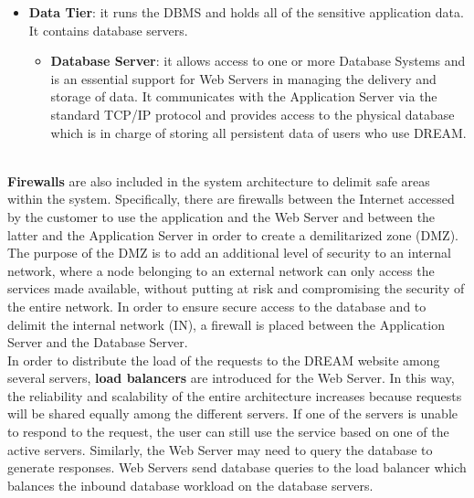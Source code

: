 \begin{itemize}
\begin{itemize}
    \end{itemize}
    \item \textbf{Data Tier}: it runs the DBMS and holds all of the sensitive application data. It contains database servers.
    \begin{itemize}
        \item \textbf{Database Server}: it allows access to one or more Database Systems and is an essential support for Web Servers in managing the delivery and storage of data. It communicates with the Application Server via the standard TCP/IP protocol and provides access to the physical database which is in charge of storing all persistent data of users who use DREAM.
    \end{itemize}
\end{itemize}\\


\textbf{Firewalls} are also included in the system architecture to delimit safe areas within the system. 
Specifically, there are firewalls between the Internet accessed by the customer to use the application and the Web Server and between the latter and the Application Server in order to create a demilitarized zone (DMZ). The purpose of the DMZ is to add an additional level of security to an internal network, where a node belonging to an external network can only access the services made available, without putting at risk and compromising the security of the entire network.
In order to ensure secure access to the database and to delimit the internal network (IN), a firewall is placed between the Application Server and the Database Server.\\


In order to distribute the load of the requests to the DREAM website among several servers, \textbf{load balancers} are introduced for the Web Server. In this way, the reliability and scalability of the entire architecture increases because requests will be shared equally among the different servers. If one of the servers is unable to respond to the request, the user can still use the service based on one of the active servers.
Similarly, the Web Server may need to query the database to generate responses. Web Servers send database queries to the load balancer which balances the inbound database workload on the database servers.



\def\fillandplacepagenumber{%
 \par\pagestyle{empty}%
\vbox to 0pt{\vss}\vfill
\vbox to 0pt{\baselineskip0pt
   \hbox to\linewidth{\hss}%
   \setlength{\footskip}{70pt}
   \baselineskip\footskip
   \hbox to\linewidth{%
     \hfil\thepage\hfil}\vss}}






